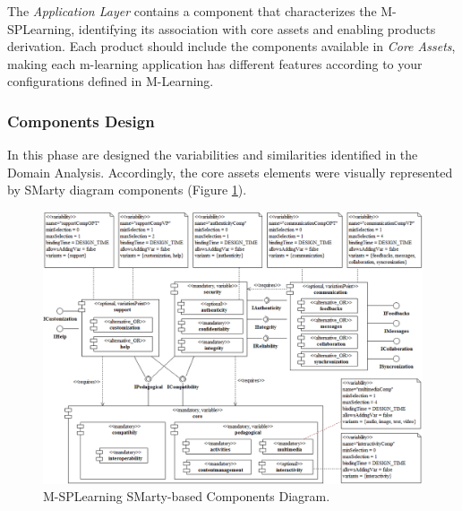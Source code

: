 The \textit{Application Layer} contains a component that characterizes the M-SPLearning, identifying its association with core assets and enabling products derivation. Each product should include the components available in \textit{Core Assets}, making each m-learning application has different features according to your configurations defined in M-Learning.

\subsubsection{Components Design}

In this phase are designed the variabilities and similarities identified in the Domain Analysis. Accordingly, the core assets elements were visually represented by SMarty diagram components (Figure \ref{figureMSPLDesign}).

\begin{figure}
\centering
\includegraphics[scale=0.445]{figures/section3/MSPLDesign}
\caption{M-SPLearning SMarty-based Components Diagram.}
\label{figureMSPLDesign}
\end{figure}

